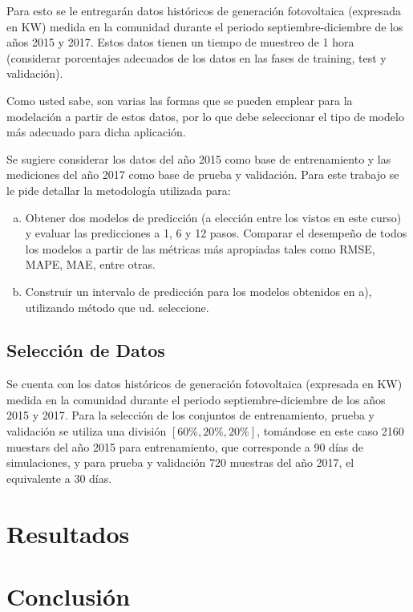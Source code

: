 \documentclass[12pt]{article}
\begin{document}
Para esto se le entregarán datos históricos de generación fotovoltaica (expresada en KW) medida en la comunidad durante el periodo septiembre-diciembre de los años 2015 y 2017. Estos datos tienen un tiempo de muestreo de 1 hora (considerar porcentajes adecuados de los datos en las fases de training, test y validación).

Como usted sabe, son varias las formas que se pueden emplear para la modelación a partir de estos datos, por lo que debe seleccionar el tipo de modelo más adecuado para dicha aplicación.

Se sugiere considerar los datos del año 2015 como base de entrenamiento y las mediciones del año 2017 como base de prueba y validación. Para este trabajo se le pide detallar la metodología utilizada para:

\begin{enumerate}[a)]
  \item Obtener dos modelos de predicción (a elección entre los vistos en este curso) y evaluar las predicciones a 1, 6 y 12 pasos. Comparar el desempeño de todos los modelos a partir de las métricas más apropiadas tales como RMSE, MAPE, MAE, entre otras.
  \item Construir un intervalo de predicción para los modelos obtenidos en a), utilizando método que ud. seleccione.
\end{enumerate}

\subsection{Selección de Datos}
Se cuenta con los datos históricos de generación fotovoltaica (expresada en KW) medida en la comunidad durante el periodo septiembre-diciembre de los años 2015 y 2017. Para la selección de los conjuntos de entrenamiento, prueba y validación se utiliza una división $[60\%,20\%,20\%]$, tomándose en este caso 2160 muestars del año 2015 para entrenamiento, que corresponde a 90 días de simulaciones, y para prueba y validación 720 muestras del año 2017, el equivalente a 30 días.

\section{Resultados}



\newpage
\section{Conclusión}


\newpage


\end{document}
